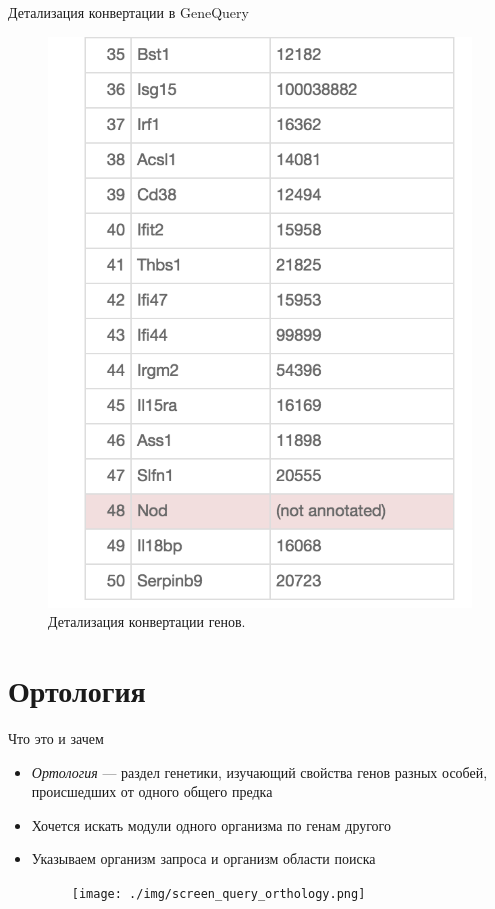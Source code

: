 \documentclass[10pt,pdf,utf8,russian,aspectratio=169]{beamer}
\begin{document}
\begin{frame}{Детализация конвертации в GeneQuery}
    \begin{figure}[p]
        \centering
        \caption{Детализация конвертации генов.}
        \includegraphics[height=0.8\textheight]{./img/screen_details.png}
    \end{figure}
\end{frame}


\section{Ортология}

\begin{frame}{Что это и зачем}
  \begin{itemize}[<+->]
    \item \emph{Ортология} --- раздел генетики, изучающий свойства генов разных особей, происшедших от одного общего предка
    \item Хочется искать модули одного организма по генам другого
    \item Указываем организм запроса и организм области поиска
        \begin{figure}[!ht]
            \centering
            \texttt{[image: ./img/screen\_query\_orthology.png]}
        \end{figure}
  \end{itemize}
\end{frame}
\end{document}

